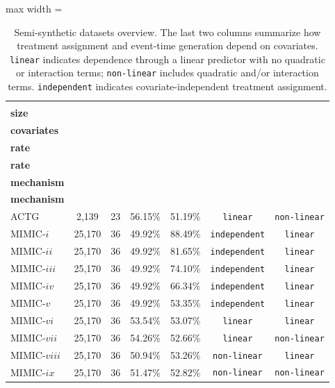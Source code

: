 \documentclass{article} %
\begin{document}
\begin{table}[htbp]
    \caption{Semi-synthetic datasets overview. The last two columns summarize how treatment assignment and event-time generation depend on covariates. \texttt{linear} indicates dependence through a linear predictor with no quadratic or interaction terms; \texttt{non-linear} includes quadratic and/or interaction terms. \texttt{independent} indicates covariate-independent treatment assignment.}
    \label{tab:semi-syn-dataset-summary} \vspace{-0.5em}
    \begin{center}
    \setlength{\tabcolsep}{5pt}
    \begin{adjustbox}{max width = \textwidth}
    \begin{tabular}{@{}lcccccc@{}}
        \toprule
        & \makecell{\textbf{Data}\\\textbf{size}} 
        & \makecell{\textbf{No.}\\\textbf{covariates}} 
        & \makecell{\textbf{Treatment}\\\textbf{rate}} 
        & \makecell{\textbf{Censoring.}\\\textbf{rate}} 
        & \makecell{\textbf{Treatment assignment}\\\textbf{mechanism}} 
        & \makecell{\textbf{Event time}\\\textbf{mechanism}} \\
        \midrule
        ACTG & 2,139 & 23 & 56.15\% & 51.19\% & \texttt{linear} & \texttt{non-linear} \\ 
        \addlinespace
        MIMIC-$i$ & 25,170 & 36 & 49.92\% & 88.49\% & \texttt{independent} & \texttt{linear} \\ 
        MIMIC-$ii$ & 25,170 & 36 & 49.92\% & 81.65\% & \texttt{independent} & \texttt{linear} \\ 
        MIMIC-$iii$ & 25,170 & 36 & 49.92\% & 74.10\% & \texttt{independent} & \texttt{linear} \\ 
        MIMIC-$iv$ & 25,170 & 36 & 49.92\% & 66.34\% & \texttt{independent} & \texttt{linear} \\ 
        MIMIC-$v$ & 25,170 & 36 & 49.92\% & 53.35\% & \texttt{independent} & \texttt{linear} \\ 
        \addlinespace
        MIMIC-$vi$ & 25,170 & 36 & 53.54\% & 53.07\% & \texttt{linear} & \texttt{linear} \\ 
        MIMIC-$vii$ & 25,170 & 36 & 54.26\% & 52.66\% & \texttt{linear} & \texttt{non-linear} \\ 
        MIMIC-$viii$ & 25,170 & 36 & 50.94\% & 53.26\% & \texttt{non-linear} & \texttt{linear} \\ 
        MIMIC-$ix$ & 25,170 & 36 & 51.47\% & 52.82\% & \texttt{non-linear} & \texttt{non-linear} \\ 
        \bottomrule
    \end{tabular}
    \end{adjustbox}
    \end{center}
\end{table}
\end{document}
